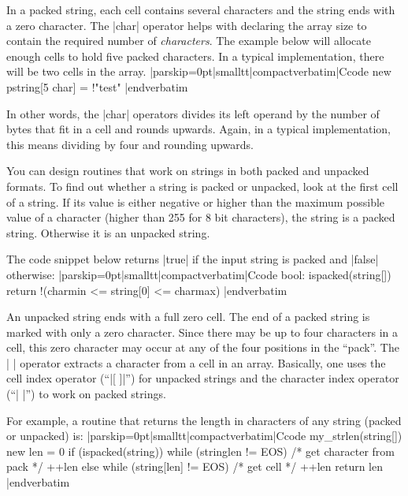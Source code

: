 In a packed string, each cell contains several characters and the string ends
with a zero character. The |char| operator helps with declaring the array
size to contain the required number of {\it characters\/}. The example below
will allocate enough cells to hold five packed characters. In a typical
implementation, there will be two cells in the array.
\listingx\verbatim|parskip=0pt|smalltt|compactverbatim|Ccode
new pstring[5 char] = !"test"
|endverbatim\endlistingx

In other words, the |char| operators divides its left operand by the number
of bytes that fit in a cell and rounds upwards. Again, in a typical
implementation, this means dividing by four and rounding upwards.

You can design routines that work on strings in both packed and unpacked
formats. To find out whether a string is packed or unpacked, look at the
first cell of a string. If its value is either negative or higher than the
maximum possible value of a character (higher than 255 for 8 bit characters),
the string is a packed string. Otherwise it is an unpacked string.

\noindent{}%
The code snippet below returns |true| if the input string is packed and |false|
otherwise:
\listingx\verbatim|parskip=0pt|smalltt|compactverbatim|Ccode
bool: ispacked(string[])
    return !(charmin <= string[0] <= charmax)
|endverbatim\endlistingx

An unpacked string ends with a full zero cell. The end of a packed string is
marked with only a zero character. Since there may be up to four characters
in a cell, this zero character may occur at any of the four positions in
the ``pack''. The |{ }| operator extracts a character from a cell in an
array. Basically, one uses the cell index operator (``|[ ]|'') for
unpacked strings and the character index operator (``|{ }|'') to work on
packed strings.

\noindent{}%
For example, a routine that returns the length in characters of any string
(packed or unpacked) is:
\listingx\verbatim|parskip=0pt|smalltt|compactverbatim|Ccode
my_strlen(string[])
    {
    new len = 0
    if (ispacked(string))
        while (string{len} != EOS)      /* get character from pack */
            ++len
    else
        while (string[len] != EOS)      /* get cell */
            ++len
    return len
    }
|endverbatim\endlistingx

